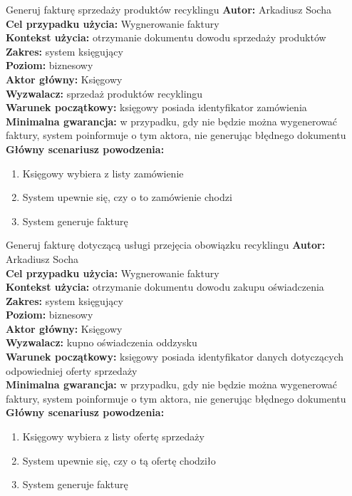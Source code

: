 \begin{usecase}{Generuj fakturę sprzedaży produktów recyklingu}
	\textbf{Autor:} Arkadiusz Socha\\
	\textbf{Cel przypadku użycia:} Wygnerowanie faktury \\
	\textbf{Kontekst użycia:} otrzymanie dokumentu dowodu sprzedaży produktów  \\
	\textbf{Zakres:} system księgujący \\
	\textbf{Poziom:} biznesowy \\
	\textbf{Aktor główny:} Księgowy \\
	\textbf{Wyzwalacz:} sprzedaż produktów recyklingu \\
	\textbf{Warunek początkowy:} księgowy posiada identyfikator zamówienia \\
	\textbf{Minimalna gwarancja:} w przypadku, gdy nie będzie można wygenerować faktury, system poinformuje o tym aktora, nie generując błędnego dokumentu \\
	\textbf{Główny scenariusz powodzenia:} 
		\begin{enumerate}
			\item Księgowy wybiera z listy zamówienie
			\item System upewnie się, czy o to zamówienie chodzi
			\item System generuje fakturę 
		\end{enumerate}
\end{usecase}

\begin{usecase}{Generuj fakturę dotyczącą usługi przejęcia obowiązku recyklingu}
	\textbf{Autor:} Arkadiusz Socha\\
	\textbf{Cel przypadku użycia:} Wygnerowanie faktury \\
	\textbf{Kontekst użycia:} otrzymanie dokumentu dowodu zakupu oświadczenia  \\
	\textbf{Zakres:} system księgujący \\
	\textbf{Poziom:} biznesowy \\
	\textbf{Aktor główny:} Księgowy \\
	\textbf{Wyzwalacz:} kupno oświadczenia oddzysku \\
	\textbf{Warunek początkowy:} księgowy posiada identyfikator danych dotyczących odpowiedniej oferty sprzedaży \\
	\textbf{Minimalna gwarancja:} w przypadku, gdy nie będzie można wygenerować faktury, system poinformuje o tym aktora, nie generując błędnego dokumentu \\
	\textbf{Główny scenariusz powodzenia:} 
		\begin{enumerate}
			\item Księgowy wybiera z listy ofertę sprzedaży
			\item System upewnie się, czy o tą ofertę chodziło
			\item System generuje fakturę 
		\end{enumerate}
\end{usecase}

